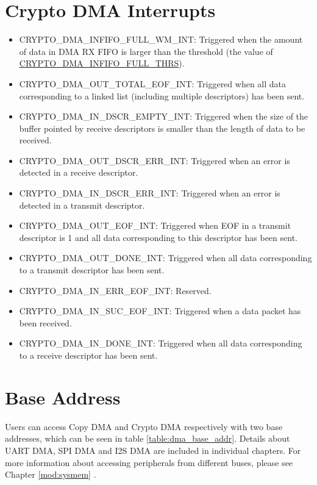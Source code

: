 \documentclass[main\_\_EN.tex]{subfiles}
\begin{document}
\section{Crypto DMA Interrupts}
\begin{itemize}
\item \label{int:CRPDAMINFIFOFULLWM}CRYPTO\_DMA\_INFIFO\_FULL\_WM\_INT: Triggered when the amount of data in DMA RX FIFO is larger than the threshold (the value of \hyperref[fielddesc:CRYPTODMAINFIFOFULLTHRS]{CRYPTO\_DMA\_INFIFO\_FULL\_THRS}).
\item \label{int:CRPDMAOUTTOTALEOFINT}CRYPTO\_DMA\_OUT\_TOTAL\_EOF\_INT: Triggered when all data corresponding to a linked list (including multiple descriptors) has been sent.
\item \label{int:CRPDMAINDSCREMPTYINT}CRYPTO\_DMA\_IN\_DSCR\_EMPTY\_INT: Triggered when the size of the buffer pointed by receive descriptors is smaller than the length of data to be received.
\item \label{int:CRPDMAOUTDSCRERRINT}CRYPTO\_DMA\_OUT\_DSCR\_ERR\_INT: Triggered when an error is detected in a receive descriptor.
\item \label{int:CRPDMAINDSCRERRINT}CRYPTO\_DMA\_IN\_DSCR\_ERR\_INT: Triggered when an error is detected in a transmit descriptor.
\item \label{int:CRPDMAOUTEOFINT}CRYPTO\_DMA\_OUT\_EOF\_INT: Triggered when EOF in a transmit descriptor is 1 and all data corresponding to this descriptor has been sent.
\item \label{int:CRPDMAOUTDONEINT}CRYPTO\_DMA\_OUT\_DONE\_INT: Triggered when all data corresponding to a transmit descriptor has been sent.
\item \label{int:CRPDMAINERREOFINT}CRYPTO\_DMA\_IN\_ERR\_EOF\_INT: Reserved.
\item \label{int:CRPDMAINSUCEOFINT}CRYPTO\_DMA\_IN\_SUC\_EOF\_INT: Triggered when a data packet has been received.
\item \label{int:CRPDMAINDONEINT}CRYPTO\_DMA\_IN\_DONE\_INT: Triggered when all data corresponding to a receive descriptor has been sent.
\end{itemize}

\section{Base Address}\label{DMA-Base-Addresses}
Users can access Copy DMA and Crypto DMA respectively with two base addresses, which can be seen in table \ref{table:dma_base_addr}. Details about UART DMA, SPI DMA and I2S DMA are included in individual chapters. For more information about accessing peripherals from different buses, please see Chapter \ref{mod:sysmem} \textit{}.
\end{document}
